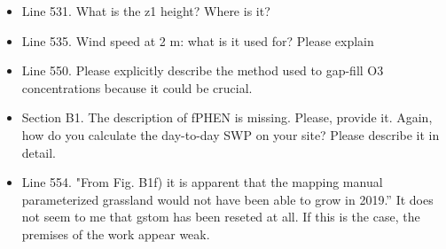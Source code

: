 \documentclass{scrartcl}
\begin{document}
\begin{itemize}
\item {\color{blue}Line 531. What is the z1 height? Where is it?}

\item {\color{blue}Line 535. Wind speed at 2 m: what is it used for? Please explain}

\item {\color{blue}Line 550. Please explicitly describe the method used to gap-fill O3 concentrations because it could be crucial.}

\item {\color{blue}Section B1. The description of fPHEN is missing. Please, provide it. Again, how do you calculate the day-to-day SWP on your site? Please describe it in detail.}

\item {\color{blue}Line 554. "From Fig. B1f) it is apparent that the mapping manual parameterized grassland would not have been able to grow in 2019.” 
It does not seem to me that gstom has been reseted at all. If this is the case, the
premises of the work appear weak.}

\end{itemize}
\end{document}
